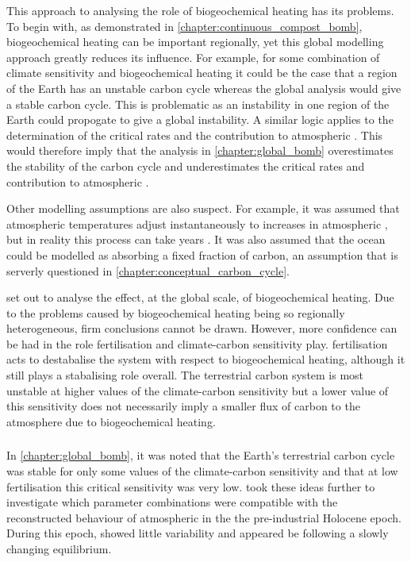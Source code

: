 This approach to analysing the role of biogeochemical heating has its problems. To begin with, as demonstrated in \cref{chapter:continuous_compost_bomb}, biogeochemical heating
can be important regionally, yet this global modelling approach greatly reduces its influence. For example, for some combination of climate sensitivity and biogeochemical heating
it could be the case that a region of the Earth has an unstable carbon cycle whereas the global analysis would give a stable carbon cycle. This is problematic as an instability in one
region of the Earth could propogate to give a global instability. A similar logic applies to the determination of the critical rates and the contribution to atmospheric .
This would therefore imply that the analysis in \cref{chapter:global_bomb} overestimates the stability of the carbon cycle and underestimates the critical rates and contribution to atmospheric
.

Other modelling assumptions are also suspect. For example, it was assumed that atmospheric temperatures adjust instantaneously to increases in atmospheric , but in
reality this process can take years \parencite{Rugenstein2019}. It was also assumed that the ocean could be modelled as absorbing a fixed fraction of carbon, an assumption that is serverly questioned in
\cref{chapter:conceptual_carbon_cycle}.

 set out to analyse the effect, at the global scale, of biogeochemical heating. Due to the problems caused by biogeochemical heating
being so regionally heterogeneous, firm conclusions cannot be drawn. However, more confidence can be had in the role  fertilisation and climate-carbon
sensitivity play.  fertilisation acts to destabalise the system with respect to biogeochemical heating, although it still plays a stabalising role
overall. The terrestrial carbon system is most unstable at higher values of the climate-carbon sensitivity but a lower value of this sensitivity does not
necessarily imply a smaller flux of carbon to the atmosphere due to biogeochemical heating.

\subsubsection{}

In \cref{chapter:global_bomb}, it was noted that the Earth's terrestrial carbon cycle was stable for only some values of the climate-carbon sensitivity and that at low
 fertilisation this critical sensitivity was very low.  took these ideas further to investigate which parameter combinations
were compatible with the reconstructed behaviour of atmospheric  in the the pre-industrial Holocene epoch. During this epoch,  showed little variability
and appeared be following a slowly changing equilibrium. 

